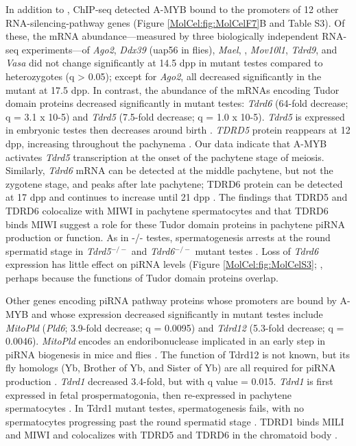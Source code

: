     In addition to \miwi{}, ChIP-seq detected A-MYB bound to the promoters of 12 other RNA-silencing-pathway genes (Figure \ref{MolCel:fig:MolCelF7}B and Table S3). Of these, the mRNA abundance—measured by three biologically independent RNA-seq experiments—of \textit{Ago2}, \textit{Ddx39} (uap56 in flies), \textit{Mael}, \mili{}, \textit{Mov10l1}, \textit{Tdrd9}, and \textit{Vasa} did not change significantly at 14.5 dpp in \amyb{} mutant testes compared to heterozygotes (q > 0.05); except for \textit{Ago2}, all decreased significantly in the mutant at 17.5 dpp. In contrast, the abundance of the mRNAs encoding Tudor domain proteins decreased significantly in \amyb{} mutant testes: \textit{Tdrd6} (64-fold decrease; q = 3.1 x 10-5) and \textit{Tdrd5} (7.5-fold decrease; q = 1.0 x 10-5). \textit{Tdrd5} is expressed in embryonic testes then decreases around birth \citep{Yabuta2011}. \textit{TDRD5} protein reappears at 12 dpp, increasing throughout the pachynema \citep{Smith2004, Yabuta2011}. Our data indicate that A-MYB activates \textit{Tdrd5} transcription at the onset of the pachytene stage of meiosis. Similarly, \textit{Tdrd6} mRNA can be detected at the middle pachytene, but not the zygotene stage, and peaks after late pachytene; TDRD6 protein can be detected at 17 dpp and continues to increase until 21 dpp \citep{Vasileva2009}. The findings that TDRD5 and TDRD6 colocalize with MIWI in pachytene spermatocytes \citep{Hosokawa2007, Vasileva2009, Yabuta2011} and that TDRD6 binds MIWI \citep{Chen2009a, Vagin2009, Vasileva2009} suggest a role for these Tudor domain proteins in pachytene piRNA production or function. As in \miwi{}-/- testes, spermatogenesis arrests at the round spermatid stage in \textit{Tdrd5}$^{-/-}$ and \textit{Tdrd6}$^{-/-}$ mutant testes \citep{Vasileva2009, Yabuta2011}. Loss of \textit{Tdrd6} expression has little effect on piRNA levels (Figure \ref{MolCel:fig:MolCelS3}; \citep{Vagin2009}, perhaps because the functions of Tudor domain proteins overlap.

    Other genes encoding piRNA pathway proteins whose promoters are bound by A-MYB and whose expression decreased significantly in \amyb{} mutant testes include \textit{MitoPld} (\textit{Pld6}; 3.9-fold decrease; q = 0.0095) and \textit{Tdrd12} (5.3-fold decrease; q = 0.0046). \textit{MitoPld} encodes an endoribonuclease implicated in an early step in piRNA biogenesis in mice and flies \citep{Houwing2007, Pane2007, Haase2010, Huang2011, Watanabe2011a, Ipsaro2012, Nishimasu2012}. The function of Tdrd12 is not known, but its fly homologs (Yb, Brother of Yb, and Sister of Yb) are all required for piRNA production \citep{Handler2011}. \textit{Tdrd1} decreased 3.4-fold, but with q value = 0.015. \textit{Tdrd1} is first expressed in fetal prospermatogonia, then re-expressed in pachytene spermatocytes \citep{Chuma2006a}. In Tdrd1 mutant testes, spermatogenesis fails, with no spermatocytes progressing past the round spermatid stage \citep{Chuma2006a}. TDRD1 binds MILI and MIWI \citep{Chen2009a, Kojima2009} and colocalizes with TDRD5 and TDRD6 in the chromatoid body \citep{Hosokawa2007}.

